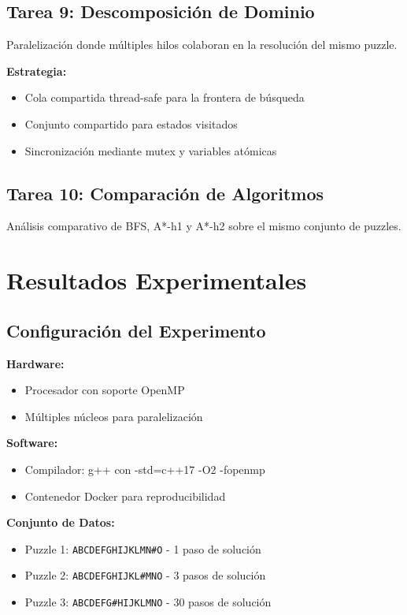 \documentclass[12pt,a4paper]{article}
\begin{document}
\subsection{Tarea 9: Descomposición de Dominio}

Paralelización donde múltiples hilos colaboran en la resolución del mismo puzzle.

\textbf{Estrategia:}
\begin{itemize}
    \item Cola compartida thread-safe para la frontera de búsqueda
    \item Conjunto compartido para estados visitados
    \item Sincronización mediante mutex y variables atómicas
\end{itemize}

\subsection{Tarea 10: Comparación de Algoritmos}

Análisis comparativo de BFS, A*-h1 y A*-h2 sobre el mismo conjunto de puzzles.

\section{Resultados Experimentales}

\subsection{Configuración del Experimento}

\textbf{Hardware:}
\begin{itemize}
    \item Procesador con soporte OpenMP
    \item Múltiples núcleos para paralelización
\end{itemize}

\textbf{Software:}
\begin{itemize}
    \item Compilador: g++ con -std=c++17 -O2 -fopenmp
    \item Contenedor Docker para reproducibilidad
\end{itemize}

\textbf{Conjunto de Datos:}
\begin{itemize}
    \item Puzzle 1: \texttt{ABCDEFGHIJKLMN\#O} - 1 paso de solución
    \item Puzzle 2: \texttt{ABCDEFGHIJKL\#MNO} - 3 pasos de solución
    \item Puzzle 3: \texttt{ABCDEFG\#HIJKLMNO} - 30 pasos de solución
\end{itemize}
\end{document}
